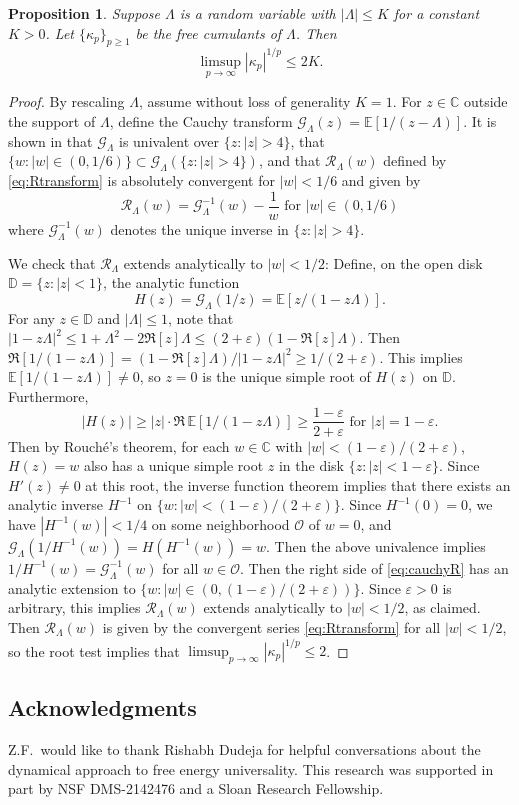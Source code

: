 \documentclass[11pt,letterpaper,reqno]{amsart}
\def\eps{\varepsilon}
\def\E{\mathbb{E}}
\def\CC{\mathbb{C}}
\def\DD{\mathbb{D}}
\def\cG{\mathcal{G}}
\def\cR{\mathcal{R}}
\def\cO{\mathcal{O}}
\newtheorem{proposition}[theorem]{Proposition}
\theoremstyle{definition}
\numberwithin{equation}{section}
\begin{document}
\begin{proposition}\label{prop:freecumulants}
Suppose $\Lambda$ is a random variable with $|\Lambda| \leq K$
for a constant $K>0$. Let $\{\kappa_p\}_{p \geq 1}$ be the free
cumulants of $\Lambda$. Then
\[\limsup_{p \to \infty} |\kappa_p|^{1/p} \leq 2K.\]
\end{proposition}
\begin{proof}
By rescaling $\Lambda$, assume without loss of generality $K=1$.
For $z \in \CC$ outside the support of $\Lambda$, define the Cauchy transform
$\cG_\Lambda(z)=\E[1/(z-\Lambda)]$. It is shown in \cite[Theorem
17]{mingo2017free} that $\cG_\Lambda$ is univalent over $\{z:|z|>4\}$, that
$\{w:|w| \in (0,1/6)\} \subset \cG_\Lambda(\{z:|z|>4\})$, and that
$\cR_\Lambda(w)$ defined by \eqref{eq:Rtransform} is absolutely
convergent for $|w|<1/6$ and given by
\begin{equation}\label{eq:cauchyR}
\cR_\Lambda(w)=\cG_\Lambda^{-1}(w)-\frac{1}{w} \text{ for } |w| \in (0,1/6)
\end{equation}
where $\cG_\Lambda^{-1}(w)$ denotes the unique inverse in $\{z:|z|>4\}$.

We check that $\cR_\Lambda$ extends analytically to $|w|<1/2$:
Define, on the open disk
$\DD=\{z:|z|<1\}$, the analytic function
\[H(z)=\cG_\Lambda(1/z)=\E[z/(1-z\Lambda)].\]
For any $z \in \DD$ and $|\Lambda| \leq 1$, note that
$|1-z\Lambda|^2 \leq 1+\Lambda^2-2\Re[z]\Lambda \leq (2+\eps)(1-\Re[z]\Lambda)$.
Then $\Re[1/(1-z\Lambda)]=(1-\Re[z]\Lambda)/|1-z\Lambda|^2 \geq 1/(2+\eps)$.
This implies $\E[1/(1-z\Lambda)] \neq 0$,
so $z=0$ is the unique simple root of $H(z)$ on $\DD$. Furthermore,
\[|H(z)| \geq |z| \cdot \Re\,\E[1/(1-z\Lambda)] \geq \frac{1-\eps}{2+\eps}
\text{ for } |z|=1-\eps.\]
Then by Rouch\'e's theorem, for each $w \in \CC$ with $|w|<(1-\eps)/(2+\eps)$,
$H(z)=w$ also has a unique simple root $z$ in the disk $\{z:|z|<1-\eps\}$.
Since $H'(z) \neq 0$ at this root,
the inverse function theorem implies that there exists an analytic
inverse $H^{-1}$ on $\{w:|w|<(1-\eps)/(2+\eps)\}$.
Since $H^{-1}(0)=0$, we have $|H^{-1}(w)|<1/4$ on some neighborhood $\cO$
of $w=0$, and $\cG_\Lambda(1/H^{-1}(w))=H(H^{-1}(w))=w$. Then the
above univalence implies $1/H^{-1}(w)=\cG_\Lambda^{-1}(w)$ for all $w \in \cO$.
Then the right side of \eqref{eq:cauchyR} has an analytic extension
to $\{w:|w| \in (0,(1-\eps)/(2+\eps))\}$. Since $\eps>0$ is arbitrary, this
implies $\cR_\Lambda(w)$ extends analytically to $|w|<1/2$, as claimed. Then
$\cR_\Lambda(w)$ is given by the convergent series \eqref{eq:Rtransform}
for all $|w|<1/2$, so the root test implies that $\limsup_{p \to \infty}
|\kappa_p|^{1/p} \leq 2$.
\end{proof}

\subsection*{Acknowledgments}
Z.F.\ would like to thank Rishabh Dudeja for helpful conversations about the dynamical approach to free energy universality. This research was supported in part by NSF DMS-2142476 and a Sloan Research Fellowship.



\end{document}
